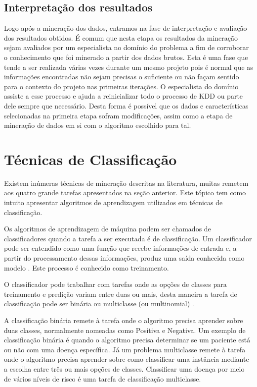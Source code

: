 \subsection{Interpretação dos resultados}

Logo após a mineração dos dados, entramos na fase de interpretação e avaliação dos resultados obtidos.  É comum que nesta etapa os resultados da mineração sejam avaliados por um especialista no domínio do problema a fim de corroborar o conhecimento que foi minerado a partir dos dados brutos. Esta é uma fase que tende a ser realizada várias vezes durante um mesmo projeto pois é normal que as informações encontradas não sejam precisas o suficiente ou não façam sentido para o contexto do projeto nas primeiras iterações. O especialista do domínio assiste a esse processo e ajuda a reinicializar todo o processo de KDD ou parte dele sempre que necessário. Desta forma é possível que os dados e características selecionadas na primeira etapa sofram modificações, assim como a etapa de mineração de dados em si com o algoritmo escolhido para tal.

\section{Técnicas de Classificação}
Existem inúmeras técnicas de mineração descritas na literatura, muitas remetem aos quatro grande tarefas apresentados na seção anterior. Este tópico tem como intuito apresentar algoritmos de aprendizagem utilizados em técnicas de classificação.

Os algoritmos de aprendizagem de máquina podem ser chamados de classificadores quando a tarefa a ser executada é de classificação. Um classificador pode ser entendido como uma função que recebe informações de entrada e, a partir do processamento dessas informações, produz uma saída conhecida como modelo \cite{Fayyad1996}. Este processo é conhecido como treinamento.

O classificador pode trabalhar com tarefas onde as opções de classes para treinamento e predição variam entre duas ou mais, desta maneira a tarefa de classificação pode ser binária ou multiclasse (ou multinomial) \cite{Aggarwal2015}.

A classificação binária remete à tarefa onde o algoritmo precisa aprender sobre duas classes, normalmente nomeadas como   Positiva e Negativa. Um exemplo de classificação binária é quando o algoritmo precisa determinar se um paciente está ou não com uma doença específica. Já um problema multiclasse remete à tarefa onde o algoritmo precisa aprender sobre como classificar uma instância mediante a escolha entre três ou mais opções de classes. Classificar uma doença por meio de vários níveis de risco é uma tarefa de classificação multiclasse.

